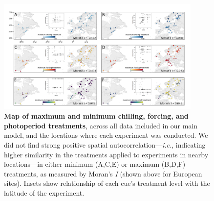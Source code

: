 \documentclass{article}
\begin{document}
\begin{figure}[h!]
\centering
\noindent \includegraphics[width=0.9\textwidth]{..//..//analyses/bb_analysis/figures/EDFig2_minmaxtreatments_COORDS.png}
\caption{\textbf{Map of maximum and minimum chilling, forcing, and photoperiod treatments}, across all data included in our main model, and the locations where each experiment was conducted. We did not find strong positive spatial autocorrelation---\emph{i.e.}, indicating higher similarity in the treatments applied to experiments in nearby locations---in either minimum (A,C,E) or maximum (B,D,F) treatments, as measured by Moran's \emph{I} (shown above for European sites). Insets show relationship of each cue's treatment level with the latitude of the experiment.}
\label{fig:trtmap}
\end{figure}
\end{document}

